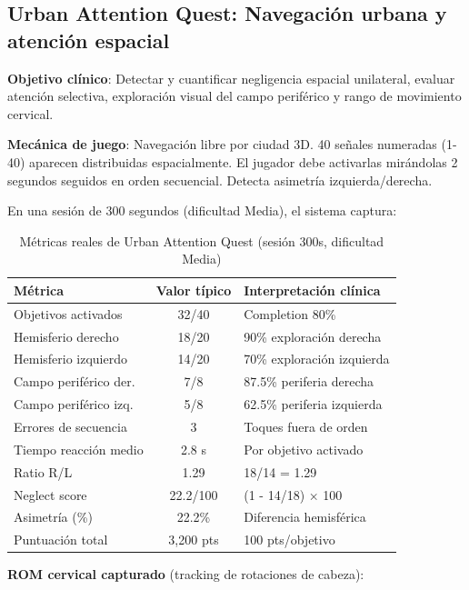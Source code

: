 \subsection{Urban Attention Quest: Navegación urbana y atención espacial}

\textbf{Objetivo clínico}: Detectar y cuantificar negligencia espacial unilateral, evaluar atención selectiva, exploración visual del campo periférico y rango de movimiento cervical.

\textbf{Mecánica de juego}: Navegación libre por ciudad 3D. 40 señales numeradas (1-40) aparecen distribuidas espacialmente. El jugador debe activarlas mirándolas 2 segundos seguidos en orden secuencial. Detecta asimetría izquierda/derecha.

En una sesión de 300 segundos (dificultad Media), el sistema captura:

\begin{table}[h]
\centering
\begin{tabular}{|l|c|l|}
\hline
\textbf{Métrica} & \textbf{Valor típico} & \textbf{Interpretación clínica} \\ \hline
Objetivos activados & 32/40 & Completion 80\% \\ \hline
Hemisferio derecho & 18/20 & 90\% exploración derecha \\ \hline
Hemisferio izquierdo & 14/20 & 70\% exploración izquierda \\ \hline
Campo periférico der. & 7/8 & 87.5\% periferia derecha \\ \hline
Campo periférico izq. & 5/8 & 62.5\% periferia izquierda \\ \hline
Errores de secuencia & 3 & Toques fuera de orden \\ \hline
Tiempo reacción medio & 2.8 s & Por objetivo activado \\ \hline
Ratio R/L & 1.29 & 18/14 = 1.29 \\ \hline
Neglect score & 22.2/100 & (1 - 14/18) × 100 \\ \hline
Asimetría (\%) & 22.2\% & Diferencia hemisférica \\ \hline
Puntuación total & 3,200 pts & 100 pts/objetivo \\ \hline
\end{tabular}
\caption{Métricas reales de Urban Attention Quest (sesión 300s, dificultad Media)}
\label{tab:city-metrics}
\end{table}

\textbf{ROM cervical capturado} (tracking de rotaciones de cabeza):

